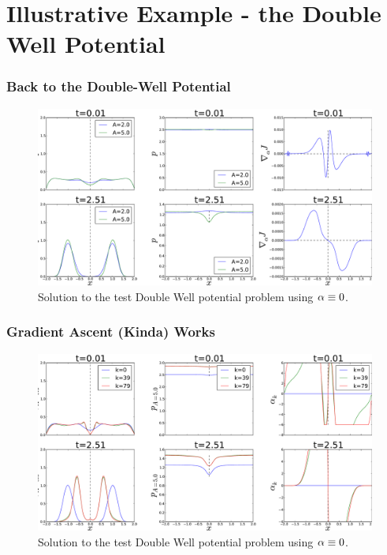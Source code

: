 \documentclass{beamer}
\begin{document}
\section{Illustrative Example - the Double Well Potential} 
\begin{frame}
\frametitle{Back to the Double-Well Potential} 
\begin{figure}[htp] 
\begin{center}  
  \includegraphics[width=.9\textwidth]{Figs/DoublewellFBSolver/FB_alpha_null_solution_2.pdf}
  \caption[labelInTOC]{Solution to the test Double Well potential problem using
  ${\alpha} \equiv 0$. }
  \label{fig:FBSoln_doublewell_alpha_null}
\end{center}
\end{figure} 

\end{frame}
\begin{frame}
\frametitle{Gradient Ascent (Kinda) Works} 
\begin{figure}[htp] 
\begin{center} 
  \includegraphics[width=.9\textwidth]{Figs/DoublewellFBSolver/FB_alpha_iterates_uICs_2.pdf}
  \caption[labelInTOC]{Solution to the test Double Well potential problem using
  ${\alpha} \equiv 0$. }
  \label{fig:FBSoln_doublewell_alpha_null}
\end{center}
\end{figure}
\end{frame}
\end{document}
